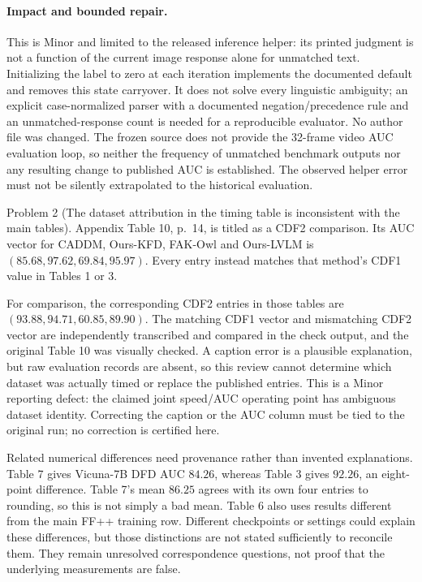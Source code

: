 \documentclass[10pt]{article}
\begin{document}
\paragraph*{Impact and bounded repair.}\mbox{}\par
This is Minor and limited to the released inference helper: its printed judgment is not a function of the current image response alone for unmatched text. Initializing the label to zero at each iteration implements the documented default and removes this state carryover. It does not solve every linguistic ambiguity; an explicit case-normalized parser with a documented negation/precedence rule and an unmatched-response count is needed for a reproducible evaluator. No author file was changed. The frozen source does not provide the 32-frame video AUC evaluation loop, so neither the frequency of unmatched benchmark outputs nor any resulting change to published AUC is established. The observed helper error must not be silently extrapolated to the historical evaluation.\par
Problem 2 (The dataset attribution in the timing table is inconsistent with the main tables).  Appendix Table 10, p. 14, is titled as a CDF2 comparison. Its AUC vector for CADDM, Ours-KFD, FAK-Owl and Ours-LVLM is \((85.68,97.62,69.84,95.97)\). Every entry instead matches that method’s CDF1 value in Tables 1 or 3.\par
For comparison, the corresponding CDF2 entries in those tables are \((93.88,94.71,60.85,89.90)\). The matching CDF1 vector and mismatching CDF2 vector are independently transcribed and compared in the check output, and the original Table 10 was visually checked. A caption error is a plausible explanation, but raw evaluation records are absent, so this review cannot determine which dataset was actually timed or replace the published entries. This is a Minor reporting defect: the claimed joint speed/AUC operating point has ambiguous dataset identity. Correcting the caption or the AUC column must be tied to the original run; no correction is certified here.\par
Related numerical differences need provenance rather than invented explanations. Table 7 gives Vicuna-7B DFD AUC \(84.26\), whereas Table 3 gives \(92.26\), an eight-point difference. Table 7’s mean \(86.25\) agrees with its own four entries to rounding, so this is not simply a bad mean. Table 6 also uses results different from the main FF++ training row. Different checkpoints or settings could explain these differences, but those distinctions are not stated sufficiently to reconcile them. They remain unresolved correspondence questions, not proof that the underlying measurements are false.\par
\end{document}

